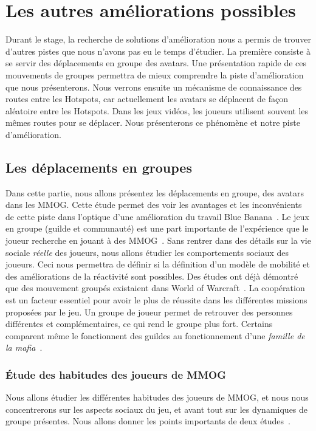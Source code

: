 \newpage
\section{Les autres améliorations possibles}

Durant le stage, la recherche de solutions d'amélioration nous a permis de trouver d'autres pistes que nous n'avons pas eu le temps d'étudier. La première consiste à se servir des déplacements en groupe des avatars. Une présentation rapide de ces mouvements de groupes permettra de mieux comprendre la piste d'amélioration que nous présenterons. Nous verrons ensuite un mécanisme de connaissance des routes entre les Hotspots, car actuellement les avatars se déplacent de façon aléatoire entre les Hotspots. Dans les jeux vidéos, les joueurs utilisent souvent les mêmes routes pour se déplacer. Nous présenterons ce phénomène et notre piste d'amélioration.

\subsection{Les déplacements en groupes}

Dans cette partie, nous allons présentez les déplacements en groupe, des avatars dans les MMOG. Cette étude permet des voir les avantages et les inconvénients de cette piste dans l'optique d'une amélioration du travail Blue Banana~\cite{191}. Le jeux en groupe (guilde et communauté) est une part importante de l'expérience que le joueur recherche en jouant à des MMOG~\cite{1501834,1255052}. Sans rentrer dans des détails sur la vie sociale \textit{réelle} des joueurs, nous allons étudier les comportements sociaux des joueurs. Ceci nous permettra de définir si la définition d'un modèle de mobilité et des améliorations de la réactivité sont possibles. Des études ont déjà démontré que des mouvement groupés existaient dans World of Warcraft~\cite{15141312}. La coopération est un facteur essentiel pour avoir le plus de réussite  dans les différentes missions proposées par le jeu. Un groupe de joueur permet de retrouver des personnes différentes et complémentaires, ce qui rend le groupe plus fort. Certains comparent même le fonctionnent des guildes au fonctionnement d'une \textit{famille de la mafia}~\cite{Jakobsson03thesopranos}.


\subsubsection{Étude des habitudes des joueurs de MMOG}
Nous allons étudier les différentes habitudes des joueurs de MMOG, et nous nous concentrerons sur les aspects sociaux du jeu, et avant tout sur les dynamiques de groupe présentes. Nous allons donner les points importants de deux études~\cite{1255052,StudyEQ}.


